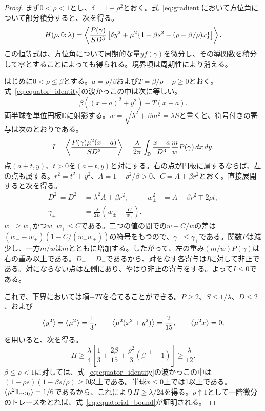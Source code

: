 \begin{proof}
まず$0<\rho<1$とし、$\delta=1-\rho^2$とおく。式~\eqref{eq:gradient}において方位角について部分積分すると、次を得る。
\begin{equation}\label{eq:equator_identity}
 H(\rho,0;\lambda)=\left\langle \frac{P(\gamma)}{SD^3}
 \left[\delta y^2+\mu^2\{1+\beta s^2-(\rho+\beta/\rho)x\}\right]\right\rangle.
\end{equation}
この恒等式は、方位角について周期的な量$y f(\gamma)$を微分し、その導関数を積分して零とすることによっても得られる。境界項は周期性により消える。

はじめに$0<\rho\le\beta$とする。$a=\rho/\beta$および$T=\beta/\rho-\rho\ge0$とおく。式~\eqref{eq:equator_identity}の波かっこの中は次に等しい。
\[
 \beta((x-a)^2+y^2)-T(x-a).
\]
両半球を単位円板$\mathbb D$に射影する。$w=\sqrt{\lambda^2+\beta m^2}=\lambda S$と書くと、符号付きの寄与は次のとおりである。
\begin{equation}\label{eq:reflection_I}
 I=\left\langle \frac{P(\gamma)\mu^2(x-a)}{SD^3}\right\rangle
 =\frac{\lambda}{2\pi}\int_{\mathbb D}\frac{x-a}{D^3}\frac m w P(\gamma)\,dx\,dy.
\end{equation}
点$(a+t,y)$、$t>0$を$(a-t,y)$と対にする。右の点が円板に属するならば、左の点も属する。$r^2=t^2+y^2$、$A=1-\rho^2/\beta>0$、$C=A+\beta r^2$とおく。直接展開すると次を得る。
\begin{align}
 D_+^2=D_-^2&=\lambda^2A+\beta r^2,&
 w_\pm^2&=A-\beta r^2\mp2\rho t,\label{eq:mirror_equalities}\\
 \gamma_\pm&=\frac{\lambda}{2D}\left(w_\pm+\frac C{w_\pm}\right).\nonumber
\end{align}
$w_-\ge w_+$かつ$w_-w_+\le C$である。二つの値の間での$w+C/w$の差は$(w_--w_+)(1-C/(w_-w_+))$の符号をもつので、$\gamma_-\le\gamma_+$である。関数$P$は減少し、一方$m/w$は$m$とともに増加する。したがって、左の重み$(m/w)P(\gamma)$は右の重み以上である。$D_+=D_-$であるから、対をなす各寄与は$I$に対して非正である。対にならない点は左側にあり、やはり非正の寄与をする。よって$I\le0$である。

これで、下界においては項$-TI$を捨てることができる。$P\ge2$、$S\le1/\lambda$、$D\le2$、および
\[
 \left\langle y^2\right\rangle=\left\langle \mu^2\right\rangle=\frac13,\qquad
 \left\langle \mu^2(x^2+y^2)\right\rangle=\frac2{15},\qquad \left\langle \mu^2x\right\rangle=0,
\]
を用いると、次を得る。
\begin{equation}\label{eq:equator_inner}
 H\ge\frac\lambda4\left[\frac13+\frac{2\beta}{15}
       +\frac{\rho^2}{3}(\beta^{-1}-1)\right]\ge\frac\lambda{12}.
\end{equation}
$\beta\le\rho<1$に対しては、式~\eqref{eq:equator_identity}の波かっこの中は$(1-\rho s)(1-\beta s/\rho)\ge0$以上である。半球$x\le0$上では1以上である。$\left\langle \mu^2\mathbf 1_{x\le0}\right\rangle=1/6$であるから、これにより$H\ge\lambda/24$を得る。$\rho\uparrow1$として一階微分のトレースをとれば、式~\eqref{eq:equatorial_bound}が証明される。
\end{proof}


